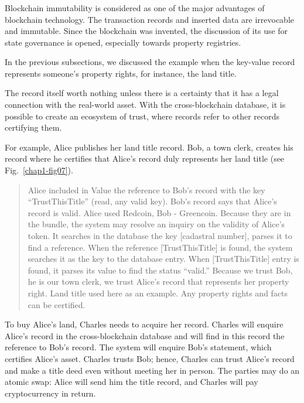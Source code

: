 \begin{multicols}{2}
\subsubsection{}\label{subsubsec-5.2.2}

Blockchain immutability is considered as one of the major advantages of blockchain technology. The transaction records and inserted data are irrevocable and immutable. Since the blockchain was invented, the discussion of its use for state governance is opened, especially towards property registries.

In the previous subsections, we discussed the example when the key-value record represents someone’s property rights, for instance, the land title.

The record itself worth nothing unless there is a certainty that it has a legal connection with the real-world asset. With the cross-blockchain database, it is possible to create an ecosystem of trust, where records refer to other records certifying them.

For example, Alice publishes her land title record. Bob, a town clerk, creates his record where he certifies that Alice’s record duly represents her land title (see Fig.~\ref{chap1-fig07}).
\begin{quote}
Alice included in Value the reference to Bob’s record with the key “TrustThisTitle” (read, any valid key). Bob’s record says that Alice’s record is valid. Alice used Redcoin, Bob - Greencoin. Because they are in the bundle, the system may resolve an inquiry on the validity of Alice’s token. It searches in the database the key [cadastral number], parses it to find a reference. When the reference [TrustThisTitle] is found, the system searches it as the key to the database entry. When [TrustThisTitle] entry is found, it parses its value to find the status “valid.” Because we trust Bob, he is our town clerk, we trust Alice’s record that represents her property right. Land title used here as an example. Any property rights and facts can be certified.
\end{quote}

To buy Alice’s land, Charles needs to acquire her record. Charles will enquire Alice’s record in the cross-blockchain database and will find in this record the reference to Bob’s record. The system will enquire Bob’s statement, which certifies Alice’s asset. Charles trusts Bob; hence, Charles can trust Alice’s record and make a title deed even without meeting her in person. The parties may do an atomic swap: Alice will send him the title record, and Charles will pay cryptocurrency in return.


\end{multicols}
